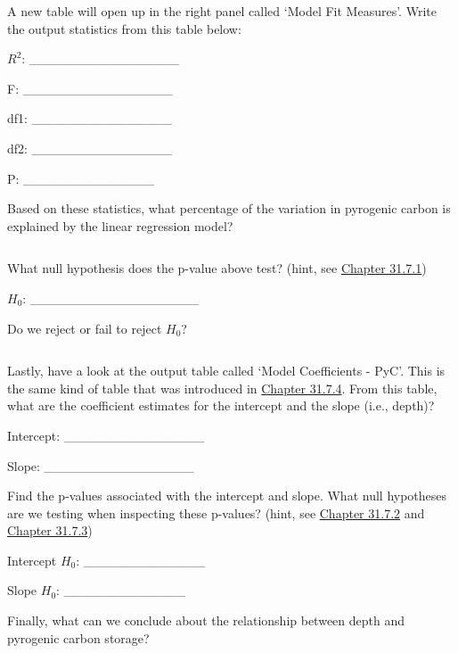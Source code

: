 \documentclass[
]{scrbook}
\begin{document}
A new table will open up in the right panel called `Model Fit Measures'.
Write the output statistics from this table below:

\(R^{2}\): \_\_\_\_\_\_\_\_\_\_\_\_\_\_\_\_

F: \_\_\_\_\_\_\_\_\_\_\_\_\_\_\_\_

df1: \_\_\_\_\_\_\_\_\_\_\_\_\_\_\_

df2: \_\_\_\_\_\_\_\_\_\_\_\_\_\_\_

P: \_\_\_\_\_\_\_\_\_\_\_\_\_\_

Based on these statistics, what percentage of the variation in pyrogenic carbon is explained by the linear regression model?

\begin{verbatim}
\end{verbatim}

What null hypothesis does the p-value above test? (hint, see \protect\hyperlink{overall-model-significance}{Chapter 31.7.1})

\(H_{0}\): \_\_\_\_\_\_\_\_\_\_\_\_\_\_\_\_\_\_

Do we reject or fail to reject \(H_{0}\)?

\begin{verbatim}
\end{verbatim}

Lastly, have a look at the output table called `Model Coefficients - PyC'.
This is the same kind of table that was introduced in \protect\hyperlink{simple-regression-output}{Chapter 31.7.4}.
From this table, what are the coefficient estimates for the intercept and the slope (i.e., depth)?

Intercept: \_\_\_\_\_\_\_\_\_\_\_\_\_\_\_

Slope: \_\_\_\_\_\_\_\_\_\_\_\_\_\_\_\_

Find the p-values associated with the intercept and slope.
What null hypotheses are we testing when inspecting these p-values? (hint, see \protect\hyperlink{significance-of-the-intercept}{Chapter 31.7.2} and \protect\hyperlink{significance-of-the-slope}{Chapter 31.7.3})

Intercept \(H_{0}\): \_\_\_\_\_\_\_\_\_\_\_\_\_

Slope \(H_{0}\): \_\_\_\_\_\_\_\_\_\_\_\_\_

Finally, what can we conclude about the relationship between depth and pyrogenic carbon storage?

\begin{verbatim}


\end{verbatim}
\end{document}
